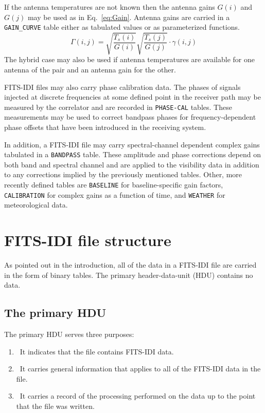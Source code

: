\documentclass[twoside]{article}
\newcommand{\Hi}[1]{\textcolor{hicol}{#1}}
\begin{document}
If the antenna temperatures are not known then the antenna gains
$G(i)$ and $G(j)$ may be used as in Eq.~\ref{eq:Gain}.  Antenna gains
are carried in a {\tt GAIN\_CURVE} table either as tabulated values or
as parameterized functions.
\begin{equation}
\Gamma(i,j) = \sqrt{\frac{T_s(i)}{G(i)}}
          \sqrt{\frac{T_s(j)}{G(j)}} \cdot \gamma(i,j)
           \label{eq:Gain}
\end{equation}
The hybrid case may also be used if antenna temperatures are available
for one antenna of the pair and an antenna gain for the other.

FITS-IDI files may also carry phase calibration data.  The phases of
signals injected at discrete frequencies at some defined point in the
receiver path may be measured by the correlator and are recorded in
{\tt PHASE-CAL} tables.  These measurements may be used to correct
bandpass phases for frequency-dependent phase offsets that have been
introduced in the receiving system.

\Hi{In addition, a FITS-IDI file may carry spectral-channel dependent
  complex gains tabulated in a {\tt BANDPASS} table.  These amplitude
  and phase corrections depend on both band and spectral channel and
  are applied to the visibility data in addition to any corrections
  implied by the previously mentioned tables.  Other, more recently
  defined tables are {\tt BASELINE} for baseline-specific gain
  factors, {\tt CALIBRATION} for complex gains as a function of time,
  and {\tt WEATHER} for meteorological data.}

\section{FITS-IDI file structure}

As pointed out in the introduction, all of the data in a FITS-IDI file
\Hi{are} carried in the form of binary tables.  The primary
header-data-unit (HDU) contains no data.

\subsection{The primary HDU}

The primary HDU serves three purposes:
\begin{enumerate}
\item{\ It indicates that the file contains FITS-IDI data.}
\item{\ It carries general information that applies to all of the
  FITS-IDI data in the file.}
\item{\ It carries a record of the processing performed on the data up
  to the point that the file was written.}
\end{enumerate}
\end{document}
